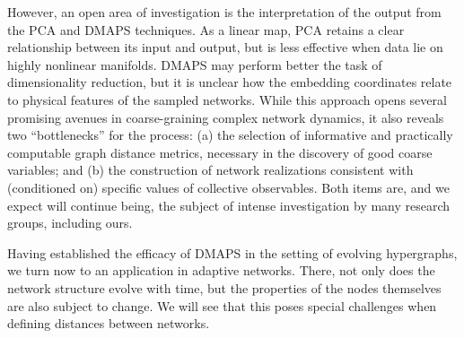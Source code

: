   However, an open area of investigation is the interpretation of the
  output from the PCA and DMAPS techniques.
  As a linear map, PCA retains a clear relationship between its input
  and output, but is less effective when data lie on highly nonlinear
  manifolds.
  DMAPS may perform better the task of dimensionality reduction, but
  it is unclear how the embedding coordinates relate to physical
  features of the sampled networks.
  While this approach opens several promising avenues in
  coarse-graining complex network dynamics, it also reveals two
  ``bottlenecks'' for the process: (a) the selection of informative
  and practically computable graph distance metrics, necessary in the
  discovery of good coarse variables; and (b) the construction of
  network realizations consistent with (conditioned on) specific
  values of collective observables.
  Both items are, and we expect will continue being, the subject of
  intense investigation by many research groups, including ours.

  Having established the efficacy of DMAPS in the setting of evolving
  hypergraphs, we turn now to an application in adaptive
  networks. There, not only does the network structure evolve with time,
  but the properties of the nodes themselves are also subject to
  change. We will see that this poses special challenges when defining
  distances between networks.
  


